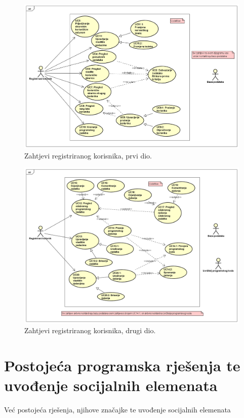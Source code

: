 \documentclass[times, utf8, zavrsni]{fer}
\begin{document}
\begin{figure}[htb]
	\centering
	\includegraphics[width=17cm]{pictures/zahtjevi/korisnik1.png}
	\caption{Zahtjevi registriranog korisnika, prvi dio.}
	\label{fig:zahtjevi-korisnik1}
\end{figure}

\begin{figure}[htb]
	\centering
	\includegraphics[width=17cm]{pictures/zahtjevi/korisnik2.png}
	\caption{Zahtjevi registriranog korisnika, drugi dio.}
	\label{fig:zahtjevi-korisnik2}
\end{figure}

\chapter{Postojeća programska rješenja te uvođenje socijalnih elemenata}
Već postojeća rješenja, njihove značajke te uvođenje socijalnih elemenata
\end{document}

